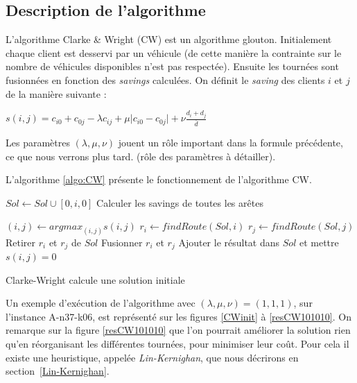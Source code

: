 \documentclass[a4paper,11pt]{article}%
\begin{document}
\subsection{Description de l'algorithme}
L'algorithme Clarke \& Wright (CW) est un algorithme glouton. 
Initialement chaque client est desservi par un véhicule (de cette manière la contrainte sur le nombre de véhicules disponibles n'est pas respectée). Ensuite les tournées sont fusionnées en fonction des \emph{savings} calculées.
On définit le \emph{saving} des clients $i$ et $j$ de la manière suivante :

\begin{center}
$s(i,j) = c_{i0} + c_{0j} - \lambda c_{ij} + \mu \vert c_{i0} - c_{0j} \vert + \nu \frac{d_i + d_j}{\overline{d}}$
\end{center}

Les paramètres $(\lambda, \mu, \nu)$ jouent un rôle important dans la formule précédente, ce que nous verrons plus tard. (rôle des paramètres à détailler). 

L'algorithme \ref{algo:CW} présente le fonctionnement de l'algorithme CW.

\begin{algorithm}
\DontPrintSemicolon %

 {
	$Sol \gets Sol \cup [0,i,0]$\;
}
Calculer les savings de toutes les arêtes\;

 {
	$(i,j) \gets argmax_{(i,j)} s(i,j)$\;
	$r_i \gets findRoute(Sol,i)$\;
	$r_j \gets findRoute(Sol,j)$\;
	 {
		Retirer $r_i$ et $r_j$ de $Sol$\;
		Fusionner $r_i$ et $r_j$\;
		Ajouter le résultat dans $Sol$ et mettre $s(i,j) = 0$\;
	}
}

\;
\caption{{\sc Clarke-Wright} calcule une solution initiale}
\label{algo:CW}
\end{algorithm}

Un exemple d'exécution de l'algorithme avec $(\lambda, \mu, \nu) = (1,1,1)$, sur l'instance A-n37-k06, est représenté sur les figures \ref{CWinit} à \ref{resCW101010}. On remarque sur la figure \ref{resCW101010} que l'on pourrait améliorer la solution rien qu'en réorganisant les différentes tournées, pour minimiser leur coût. Pour cela il existe une heuristique, appelée \emph{Lin-Kernighan}, que nous décrirons en section~\ref{Lin-Kernighan}.
\end{document}
